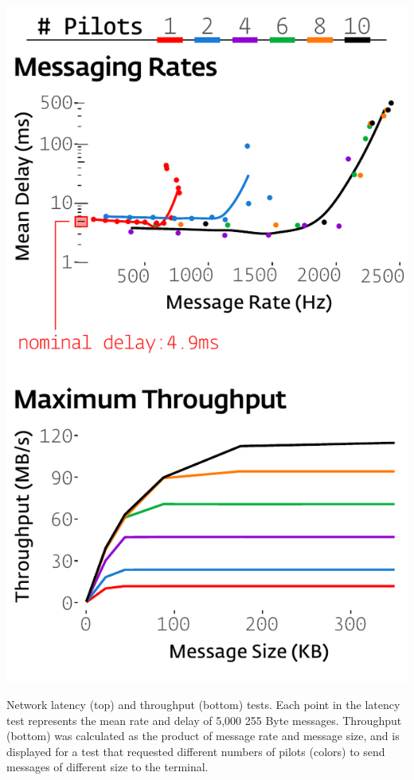 \begin{marginfigure}[-0.4cm]
\includegraphics[]{figures/test_net_combined.pdf}

\caption{Network latency (top) and throughput (bottom) tests. Each point in the latency test represents the mean rate and delay of 5,000 255 Byte messages. Throughput (bottom) was calculated as the product of message rate and message size, and is displayed for a test that requested different numbers of pilots (colors) to send messages of different size to the terminal.}
\label{fig:speed}
\end{marginfigure}

